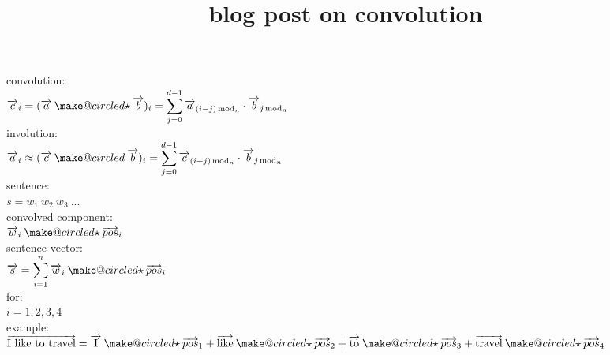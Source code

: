 \documentclass[12pt]{article}
\title{blog post on convolution}
\author{}
\date{}
\makeatletter
\newcommand{\ostar}{\mathbin{\mathpalette\make@circled\star}}
\newcommand{\oslash}{\mathbin{\mathpalette\make@circled{\/}}}
\newcommand{\make@circled}[2]{%
  \ooalign{$\m@th#1\smallbigcirc{#1}$\cr\hidewidth$\m@th#1#2$\hidewidth\cr}%
}
\newcommand{\smallbigcirc}[1]{%
  \vcenter{\hbox{$\m@th#1\bigcirc$}}%
}
\newcommand{\dsum}{\displaystyle\sum}
\renewcommand{\vec}[1]{\overrightarrow{#1}}
\makeatother
\begin{document}
\maketitle

convolution:\\[1em]
$\vec{c}_i = (\vec{a} \ostar \vec{b})_i = \dsum_{j=0}^{d-1} \vec{a}_{(i-j)\,\mathrm{mod}_n} \cdot \vec{b}_{j\,\mathrm{mod}_n}$\\[1em]
involution:\\[1em]
$\vec{a}_i \approx (\vec{c} \oslash \vec{b})_i = \dsum_{j=0}^{d-1} \vec{c}_{(i+j)\,\mathrm{mod}_n} \cdot \vec{b}_{j\,\mathrm{mod}_n}$\\[1em]
sentence:\\[1em]
$s = w_1\ w_2\ w_3\ ...$\\[1em]
convolved component:\\[1em]
$\vec{w}_i \ostar \vec{pos}_i$\\[1em]
sentence vector:\\[1em]
$\vec{s} = \dsum_{i=1}^n \vec{w}_i \ostar \vec{pos}_i$\\[1em]
for:\\[1em]
$i = 1, 2, 3, 4$\\[1em]
example:\\[1em]
$\vec{\mathrm{I\ like\ to\ travel}} = \vec{\mathrm{I}}\ostar\vec{pos}_1 + \vec{\mathrm{like}}\ostar\vec{pos}_2 + \vec{\mathrm{to}}\ostar\vec{pos}_3 + \vec{\mathrm{travel}}\ostar\vec{pos}_4$
\end{document}
